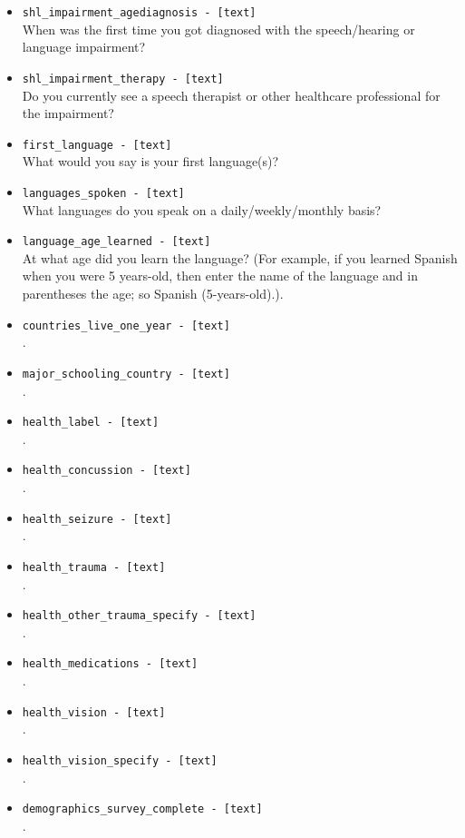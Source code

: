 \begin{description}
\begin{addmargin}[0em]{0em}
\begin{addmargin}[1em]{0em}
\begin{itemize}
            \item \verb|shl_impairment_agediagnosis - [text]|\\When was the first time you got diagnosed with the speech/hearing or language impairment?
            \item \verb|shl_impairment_therapy - [text]|\\Do you currently see a speech therapist or other healthcare professional for the impairment?
            \item \verb|first_language - [text]|\\What would you say is your first language(s)?
            \item \verb|languages_spoken - [text]|\\What languages do you speak on a daily/weekly/monthly basis?
            \item \verb|language_age_learned - [text]|\\At what age did you learn the language? (For example, if you learned Spanish when you were 5 years-old, then enter the name of the language and in parentheses the age; so Spanish (5-years-old).).
            \item \verb|countries_live_one_year - [text]|\\.
            \item \verb|major_schooling_country - [text]|\\.
            \item \verb|health_label - [text]|\\.
            \item \verb|health_concussion - [text]|\\.
            \item \verb|health_seizure - [text]|\\.
            \item \verb|health_trauma - [text]|\\.
            \item \verb|health_other_trauma_specify - [text]|\\.
            \item \verb|health_medications - [text]|\\.
            \item \verb|health_vision - [text]|\\.
            \item \verb|health_vision_specify - [text]|\\.
            \item \verb|demographics_survey_complete - [text]|\\.

\end{itemize}
\end{addmargin}
\end{addmargin}
\end{description}
